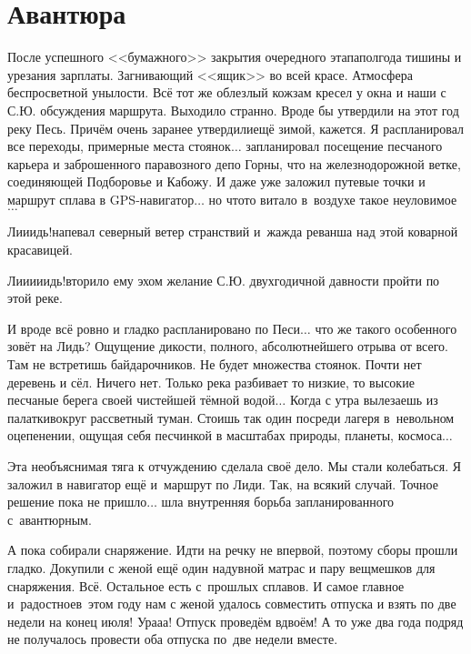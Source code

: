 \chapter{Авантюра} 
\vepsianrose

После успешного <<бумажного>> закрытия очередного этапа\mdash полгода тишины и урезания зарплаты. Загнивающий <<ящик>> во всей красе. Атмосфера беспросветной унылости. Всё тот же облезлый кожзам кресел у окна и наши с С.Ю. обсуждения маршрута. Выходило странно. Вроде бы утвердили на этот год реку Песь. Причём очень заранее утвердили\mdash ещё зимой, кажется. Я распланировал все переходы, примерные места стоянок$\ldots$ запланировал посещение песчаного карьера и заброшенного паравозного депо Горны, что на железнодорожной ветке, соединяющей Подборовье и Кабожу. И даже уже заложил путевые точки и маршрут сплава в GPS-навигатор$\ldots$ но что\sdash то витало в~воздухе такое неуловимое$\ldots$
 
\diagdash Ли\sdash и\sdash идь!\mdash напевал северный ветер странствий и~жажда реванша над этой коварной красавицей.

\diagdash Ли\sdash и\sdash и\sdash и\sdash идь!\mdash вторило ему эхом желание С.Ю. двухгодичной давности пройти по этой реке. 

И вроде всё ровно и гладко распланировано по Песи$\ldots$ что же такого особенного зовёт на Лидь? Ощущение дикости, полного, абсолютнейшего отрыва от всего. Там не встретишь байдарочников. Не будет множества стоянок. Почти нет деревень и сёл. Ничего нет. Только река разбивает то низкие, то высокие песчаные берега своей чистейшей тёмной водой$\ldots$ Когда с утра вылезаешь из палатки\mdash вокруг рассветный туман. Стоишь так один посреди лагеря в~невольном оцепенении, ощущая себя песчинкой в масштабах природы, планеты, космоса$\ldots$

Эта необъяснимая тяга к отчуждению сделала своё дело. Мы стали колебаться. Я заложил в навигатор ещё и~маршрут по Лиди. Так, на всякий случай. Точное решение пока не пришло$\ldots$ шла внутренняя борьба запланированного с~авантюрным.

А пока собирали снаряжение. Идти на речку не впервой, поэтому сборы прошли гладко. Докупили с женой ещё один надувной матрас и пару вещмешков для снаряжения. Всё. Остальное есть с~прошлых сплавов. И самое главное и~радостное\mdash в~этом году нам с женой удалось совместить отпуска и взять по две недели на конец июля! Ура\sdash а\sdash а! Отпуск проведём вдвоём! А то уже два года подряд не получалось провести оба отпуска по~две недели вместе.

